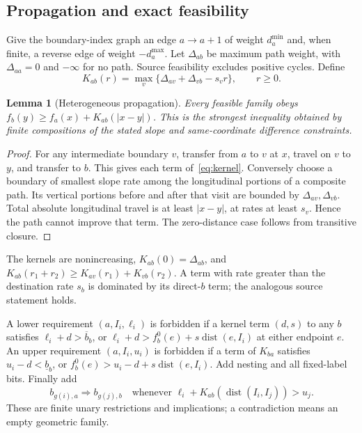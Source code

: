 \documentclass[10pt,letterpaper]{article}
\newtheorem{lemma}[proposition]{Lemma}
\newcommand{\dist}{\operatorname{dist}}
\begin{document}
\subsection{Propagation and exact feasibility}
Give the boundary-index graph an edge $a\to a+1$ of weight $d_a^{\min}$ and, when finite, a reverse edge of weight $-d_a^{\max}$. Let $\Delta_{ab}$ be maximum path weight, with $\Delta_{aa}=0$ and $-\infty$ for no path. Source feasibility excludes positive cycles. Define
\begin{equation}
K_{ab}(r)=\max_v\{\Delta_{av}+\Delta_{vb}-s_v r\},\qquad r\ge0.\label{eq:kernel}
\end{equation}
\begin{lemma}[Heterogeneous propagation]\label{lem:kernel}
Every feasible family obeys $f_b(y)\ge f_a(x)+K_{ab}(|x-y|)$. This is the strongest inequality obtained by finite compositions of the stated slope and same-coordinate difference constraints.
\end{lemma}
\begin{proof}
For any intermediate boundary $v$, transfer from $a$ to $v$ at $x$, travel on $v$ to $y$, and transfer to $b$. This gives each term of~\eqref{eq:kernel}. Conversely choose a boundary of smallest slope rate among the longitudinal portions of a composite path. Its vertical portions before and after that visit are bounded by $\Delta_{av},\Delta_{vb}$. Total absolute longitudinal travel is at least $|x-y|$, at rates at least $s_v$. Hence the path cannot improve that term. The zero-distance case follows from transitive closure.
\end{proof}
The kernels are nonincreasing, $K_{ab}(0)=\Delta_{ab}$, and $K_{ab}(r_1+r_2)\ge K_{av}(r_1)+K_{vb}(r_2)$. A term with rate greater than the destination rate $s_b$ is dominated by its direct-$b$ term; the analogous source statement holds.

A lower requirement $(a,I_i,\ell_i)$ is forbidden if a kernel term $(d,s)$ to any $b$ satisfies $\ell_i+d>\overline b_b$, or $\ell_i+d>f_b^0(e)+s\dist(e,I_i)$ at either endpoint $e$. An upper requirement $(a,I_i,u_i)$ is forbidden if a term of $K_{ba}$ satisfies $u_i-d<\underline b_b$, or $f_b^0(e)>u_i-d+s\dist(e,I_i)$. Add nesting and all fixed-label bits. Finally add
\begin{equation}
b_{g(i),a}\Rightarrow b_{g(j),b}
\quad\text{whenever }\ell_i+K_{ab}(\dist(I_i,I_j))>u_j.\label{eq:imp}
\end{equation}
These are finite unary restrictions and implications; a contradiction means an empty geometric family.
\end{document}
